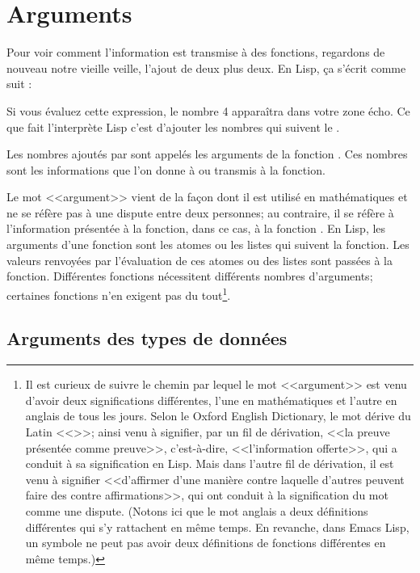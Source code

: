 \section{Arguments}

Pour voir comment l'information est transmise à des fonctions,
regardons de nouveau notre vieille veille, l'ajout de deux plus
deux. En Lisp, ça s'écrit comme suit :
\begin{center}
\end{center}

Si vous évaluez cette expression, le nombre 4 apparaîtra dans votre
zone écho. Ce que fait l'interprète Lisp c'est d'ajouter les nombres
qui suivent le \tm{+}.

Les nombres ajoutés par \tm{+} sont appelés les arguments de la
fonction \tm{+}. Ces nombres sont les informations que l'on donne à ou
transmis à la fonction. 

Le mot <<argument>> vient de la façon dont il est utilisé en
mathématiques et ne se réfère pas à une dispute entre deux personnes;
au contraire, il se réfère à l'information présentée à la fonction,
dans ce cas, à la fonction \tm{+}. En Lisp, les arguments d'une
fonction sont les atomes ou les listes qui suivent la fonction. Les
valeurs renvoyées par l'évaluation de ces atomes ou des listes sont
passées à la fonction. Différentes fonctions nécessitent différents
nombres d'arguments; certaines fonctions n'en exigent pas du
tout\footnote{Il est curieux de suivre le chemin par lequel le mot
  <<argument>> est venu d'avoir deux significations différentes, l'une
  en mathématiques et l'autre en anglais de tous les jours. Selon le
  Oxford English Dictionary, le mot dérive du Latin <<>>; ainsi venu à signifier, par un fil de
  dérivation, <<la preuve présentée comme preuve>>, c'est-à-dire,
  <<l'information offerte>>, qui a conduit à sa signification en
  Lisp. Mais dans l'autre fil de dérivation, il est venu à signifier
  <<d'affirmer d'une manière contre laquelle d'autres peuvent faire
  des contre affirmations>>, qui ont conduit à la signification du mot
  comme une dispute. (Notons ici que le mot anglais a deux définitions
  différentes qui s'y rattachent en même temps. En revanche, dans
  Emacs Lisp, un symbole ne peut pas avoir deux définitions de
  fonctions différentes en même temps.)}. 

\subsection{Arguments des types de données}

